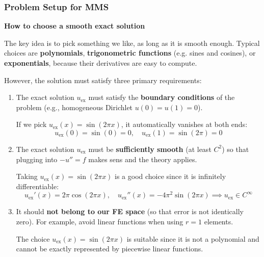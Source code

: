 \subsubsection{Problem Setup for MMS}\label{sec:problem-setup-for-mms}

\begin{flushleft}
    \textcolor{Green3}{ \textbf{How to choose a smooth exact solution}}
\end{flushleft}
The key idea is to pick something we like, as long as it is smooth enough. Typical choices are \textbf{polynomials}, \textbf{trigonometric functions} (e.g. sines and cosines), or \textbf{exponentials}, because their derivatives are easy to compute.

\highspace
However, the solution must satisfy three primary requirements:
\begin{enumerate}
    \item The exact solution $u_\text{ex}$ must satisfy the \textbf{boundary conditions} of the problem (e.g., homogeneous Dirichlet $u(0) = u(1) = 0$).
    \begin{examplebox}
        If we pick $u_\text{ex}(x) = \sin(2 \pi x)$, it automatically vanishes at both ends:
        \begin{equation*}
            u_\text{ex}(0) = \sin(0) = 0, \quad u_\text{ex}(1) = \sin(2 \pi) = 0
        \end{equation*}
    \end{examplebox}
    \setcounter{example}{\theexample-1}
    

    \item The exact solution $u_\text{ex}$ must be \textbf{sufficiently smooth} (at least $C^2$) so that plugging into $-u'' = f$ makes sens and the theory applies.
    \begin{examplebox}
        Taking $u_\text{ex}(x) = \sin(2 \pi x)$ is a good choice since it is infinitely differentiable:
        \begin{equation*}
            u_\text{ex}'(x) = 2 \pi \cos(2 \pi x), \quad u_\text{ex}''(x) = -4 \pi^2 \sin(2 \pi x) \implies u_\text{ex} \in C^\infty
        \end{equation*}
    \end{examplebox}
    \setcounter{example}{\theexample-1}


    \item It should \textbf{not belong to our FE space} (so that error is not identically zero). For example, avoid linear functions when using $r = 1$ elements.
    \begin{examplebox}
        The choice $u_\text{ex}(x) = \sin(2 \pi x)$ is suitable since it is not a polynomial and cannot be exactly represented by piecewise linear functions.
    \end{examplebox}
\end{enumerate}

